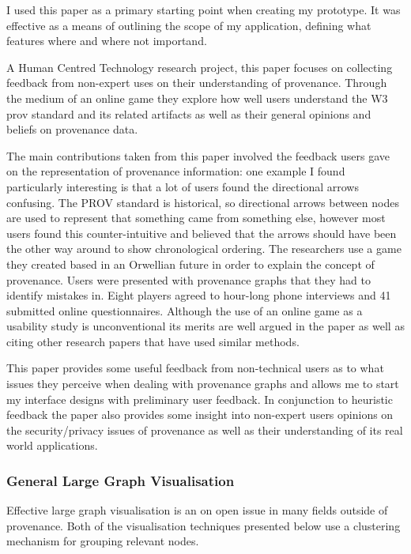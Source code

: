 I used this paper as a primary starting point when creating my prototype. It was effective as a means of outlining the scope of my application, defining what features where and where not importand.


A Human Centred Technology research project, this paper focuses on collecting feedback from non-expert uses on their understanding of provenance. Through the medium of an online game they explore how well users understand the W3 prov standard\cite{primer2013} and its related artifacts as well as their general opinions and beliefs on provenance data.

The main contributions taken from this paper involved the feedback users gave on the representation of provenance information: one example I found particularly interesting is that a lot of users found the directional arrows confusing. The PROV standard is historical, so directional arrows between nodes are used to represent that something came from something else, however most users found this counter-intuitive and believed that the arrows should have been the other way around to show chronological ordering. The researchers use a game they created based in an Orwellian future in order to explain the concept of provenance. Users were presented with provenance graphs that they had to identify mistakes in. Eight players agreed to hour-long phone interviews and 41 submitted online questionnaires. Although the use of an online game as a usability study is unconventional its merits are well argued in the paper as well as citing other research papers that have used similar methods.

This paper provides some useful feedback from non-technical users as to what issues they perceive when dealing with provenance graphs and allows me to start my interface designs with preliminary user feedback. In conjunction to heuristic feedback the paper also provides some insight into non-expert users opinions on the security/privacy issues of provenance as well as their understanding of its real world applications.

\subsubsection{General Large Graph Visualisation}
\label{sub:large_graph_visualisation}

Effective large graph visualisation is an on open issue in many fields outside of provenance. Both of the visualisation techniques presented below use a clustering mechanism for grouping relevant nodes. 

